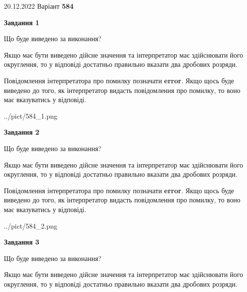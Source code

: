 \documentclass[12pt, ukrainian]{article}
\begin{document}
{20.12.2022 Варіант \No \textbf { 584 }\par}
{
\begin {Large}

{\begin {center}\textbf{Завдання 1}\end {center}}\par
Що буде виведено за виконання? \par

Якщо має бути виведено дійсне значення та інтерпретатор має здійснювати його округлення, 
то у відповіді достатньо правильно вказати два дробових розряди.

Повідомлення інтерпретатора про помилку позначати \textbf{error}.
Якщо щось буде виведено до того, як інтерпретатор видасть повідомлення про помилку, 
то воно має вказуватись у відповіді. \par

\begin{center}
	{../pict/584_1.png}
\end{center}
\newpage

{\begin {center}\textbf{Завдання 2}\end {center}}\par
Що буде виведено за виконання? \par

Якщо має бути виведено дійсне значення та інтерпретатор має здійснювати його округлення, 
то у відповіді достатньо правильно вказати два дробових розряди.

Повідомлення інтерпретатора про помилку позначати \textbf{error}.
Якщо щось буде виведено до того, як інтерпретатор видасть повідомлення про помилку, 
то воно має вказуватись у відповіді. \par

\begin{center}
	{../pict/584_2.png}
\end{center}
\newpage

{\begin {center}\textbf{Завдання 3}\end {center}}\par
Що буде виведено за виконання? \par

Якщо має бути виведено дійсне значення та інтерпретатор має здійснювати його округлення, 
то у відповіді достатньо правильно вказати два дробових розряди.


\end{Large}}
\end{document}
